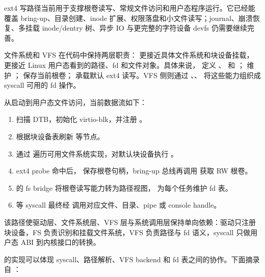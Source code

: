 ext4 写路径当前用于支撑根卷读写、常规文件访问和用户态程序运行。它已经能覆盖 bring-up、目录创建、inode 扩展、权限落盘和小文件读写；journal、崩溃恢复、多挂载 inode/dentry 树、异步 IO 与更完整的字符设备 devfs 仍需要继续完善。

文件系统和 VFS 在代码中保持两层职责： 更接近具体文件系统和块设备挂载， 更接近 Linux 用户态看到的路径、fd 和文件对象。具体来说， 定义 、 和 ； 维护 ； 保存当前根卷； 承载默认 ext4 读写。VFS 侧则通过 、、 将这些能力组织成 syscall 可用的 fd 操作。

从启动到用户态文件访问，当前数据流如下：

\begin{enumerate}
 \item {} 扫描 DTB，初始化 virtio-blk，并注册 。
 \item {} 根据块设备表刷新  等节点。
 \item {} 通过  遍历可用文件系统实现，对默认块设备执行 。
 \item ext4 probe 命中后， 保存根卷句柄，bring-up 总线再调用  获取 RW 根卷。
 \item {} 的 fs bridge 将根卷读写能力转为路径视图， 为每个任务维护 fd 表。
 \item {} 等 syscall 最终经  调用对应文件、目录、pipe 或 console handle。
\end{enumerate}

该路径使驱动层、文件系统层、VFS 层与系统调用层保持单向依赖：驱动只注册块设备，FS 负责识别和挂载文件系统，VFS 负责路径与 fd 语义，syscall 只做用户态 ABI 到内核接口的转换。

 的实现可以体现 syscall、路径解析、VFS backend 和 fd 表之间的协作。下面摘录自 ：

